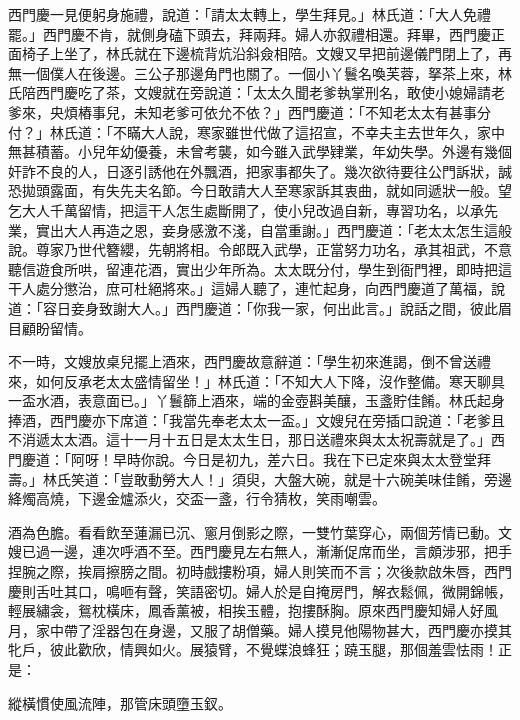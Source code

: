西門慶一見便躬身施禮，說道：「請太太轉上，學生拜見。」林氏道：「大人免禮罷。」西門慶不肯，就側身磕下頭去，拜兩拜。婦人亦叙禮相還。拜畢，西門慶正面椅子上坐了，林氏就在下邊梳背炕沿斜僉相陪。文嫂又早把前邊儀門閉上了，再無一個僕人在後邊。三公子那邊角門也關了。一個小丫鬟名喚芙蓉，拏茶上來，林氏陪西門慶吃了茶，文嫂就在旁說道：「太太久聞老爹執掌刑名，敢使小媳婦請老爹來，央煩樁事兒，未知老爹可依允不依？」{}西門慶道：「不知老太太有甚事分付？」林氏道：「不瞞大人說，寒家雖世代做了這招宣，不幸夫主去世年久，家中無甚積蓄。小兒年幼優養，未曾考襲，如今雖入武學肄業，年幼失學。外邊有幾個奸詐不良的人，日逐引誘他在外飄酒，把家事都失了。幾次欲待要往公門訴狀，誠恐拋頭露面，有失先夫名節。{}今日敢請大人至寒家訴其衷曲，就如同遞狀一般。望乞大人千萬留情，把這干人怎生處斷開了，使小兒改過自新，專習功名，以承先業，實出大人再造之恩，妾身感激不淺，自當重謝。」西門慶道：「老太太怎生這般說。尊家乃世代簪纓，先朝將相。令郎既入武學，正當努力功名，承其祖武，不意聽信遊食所哄，留連花酒，實出少年所為。太太既分付，學生到衙門裡，即時把這干人處分懲治，庶可杜絕將來。」這婦人聽了，連忙起身，向西門慶道了萬福，說道：「容日妾身致謝大人。」西門慶道：「你我一家，何出此言。」說話之間，彼此眉目顧盼留情。

不一時，文嫂放桌兒擺上酒來，西門慶故意辭道：{}「學生初來進謁，倒不曾送禮來，如何反承老太太盛情留坐！」林氏道：「不知大人下降，沒作整備。寒天聊具一盃水酒，表意面已。」丫鬟篩上酒來，端的金壺斟美釀，玉盞貯佳餚。林氏起身捧酒，西門慶亦下席道：「我當先奉老太太一盃。」文嫂兒在旁插口說道：「老爹且不消遞太太酒。這十一月十五日是太太生日，那日送禮來與太太祝壽就是了。」西門慶道：「阿呀！早時你說。今日是初九，差六日。我在下已定來與太太登堂拜壽。」林氏笑道：「豈敢動勞大人！」須臾，大盤大碗，就是十六碗美味佳餚，旁邊絳燭高燒，下邊金爐添火，交盃一盞，行令猜枚，笑雨嘲雲。

酒為色膽。看看飲至蓮漏已沉、窻月倒影之際，一雙竹葉穿心，兩個芳情已動。文嫂已過一邊，連次呼酒不至。西門慶見左右無人，漸漸促席而坐，言頗涉邪，把手捏腕之際，挨肩擦膀之間。初時戲摟粉項，婦人則笑而不言；次後款啟朱唇，西門慶則舌吐其口，鳴咂有聲，笑語密切。{}婦人於是自掩房門，解衣鬆佩，微開錦帳，輕展繡衾，鴛枕橫床，鳳香薰被，相挨玉體，抱摟酥胸。原來西門慶知婦人好風月，家中帶了淫器包在身邊，又服了胡僧藥。婦人摸見他陽物甚大，西門慶亦摸其牝戶，彼此歡欣，情興如火。展猿臂，不覺蝶浪蜂狂；蹺玉腿，那個羞雲怯雨！正是：

\begin{myquote} 
縱橫慣使風流陣，那管床頭墮玉釵。
\end{myquote} 

